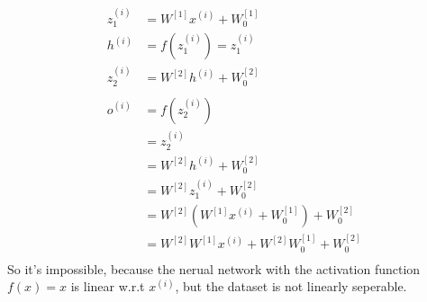 \begin{answer}
    $$
    \begin{aligned}
        z_1^{(i)} &= W^{[1]}x^{(i)} + W^{[1]}_0\\
        h^{(i)} &= f(z_1^{(i)}) = z_1^{(i)} \\
        z_2^{(i)} &= W^{[2]}h^{(i)} + W^{[2]}_0\\
        \quad \\
        o^{(i)} &= f(z_2^{(i)})  \\
        &= z_2^{(i)}\\
        &= W^{[2]}h^{(i)} + W^{[2]}_0 \\
        &= W^{[2]}z_1^{(i)} + W^{[2]}_0 \\
        &= W^{[2]}(W^{[1]}x^{(i)} + W^{[1]}_0) + W^{[2]}_0 \\
        &= W^{[2]}W^{[1]}x^{(i)} + W^{[2]}W^{[1]}_0 + W^{[2]}_0 \\
    \end{aligned}
    $$
    So it's impossible, because the nerual network with the activation function $f(x) = x$ is linear w.r.t $x^{(i)}$, but the dataset is not linearly seperable.
\end{answer}
